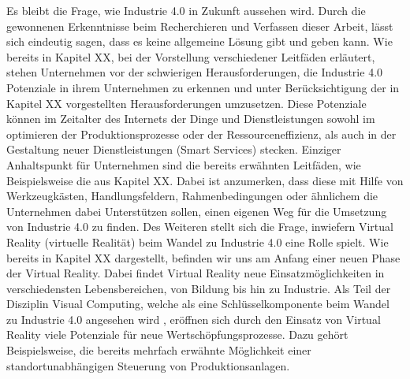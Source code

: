 Es bleibt die Frage, wie Industrie 4.0 in Zukunft aussehen wird. Durch die gewonnenen Erkenntnisse beim Recherchieren und Verfassen dieser Arbeit, lässt sich eindeutig sagen, dass es keine allgemeine Lösung gibt und geben kann. Wie bereits in Kapitel XX, bei der Vorstellung verschiedener Leitfäden erläutert, stehen Unternehmen vor der schwierigen Herausforderungen, die Industrie 4.0 Potenziale in ihrem Unternehmen zu erkennen und unter Berücksichtigung der in Kapitel XX vorgestellten Herausforderungen umzusetzen. Diese Potenziale können im Zeitalter des Internets der Dinge und Dienstleistungen sowohl im optimieren der Produktionsprozesse oder der Ressourceneffizienz, als auch in der Gestaltung neuer Dienstleistungen (Smart Services) stecken. 
Einziger Anhaltspunkt für Unternehmen sind die bereits erwähnten Leitfäden, wie Beispielsweise die aus Kapitel XX. Dabei ist anzumerken, dass diese mit Hilfe von Werkzeugkästen, Handlungsfeldern, Rahmenbedingungen oder ähnlichem die Unternehmen dabei Unterstützen sollen, einen eigenen Weg für die Umsetzung von Industrie 4.0 zu finden.
\newline\newline
Des Weiteren stellt sich die Frage, inwiefern Virtual Reality (virtuelle Realität) beim Wandel zu Industrie 4.0 eine Rolle spielt. Wie bereits in Kapitel XX dargestellt, befinden wir uns am Anfang einer neuen Phase der Virtual Reality. Dabei findet Virtual Reality neue Einsatzmöglichkeiten in verschiedensten Lebensbereichen, von Bildung bis hin zu Industrie. Als Teil der Disziplin Visual Computing, welche als eine Schlüsselkomponente beim Wandel zu Industrie 4.0 angesehen wird \cite[S.1]{17}, eröffnen sich durch den Einsatz von Virtual Reality viele Potenziale für neue Wertschöpfungsprozesse. Dazu gehört Beispielsweise, die bereits mehrfach erwähnte Möglichkeit einer standortunabhängigen Steuerung von Produktionsanlagen.

